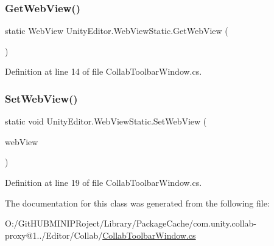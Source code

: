 \subsubsection{\texorpdfstring{GetWebView()}{GetWebView()}}
{\footnotesize\ttfamily static Web\+View Unity\+Editor.\+Web\+View\+Static.\+Get\+Web\+View (\begin{DoxyParamCaption}{ }\end{DoxyParamCaption})\hspace{0.3cm}{\ttfamily [static]}}



Definition at line 14 of file Collab\+Toolbar\+Window.\+cs.

\mbox{\label{class_unity_editor_1_1_web_view_static_aa02b3cff0fabf2f7ebf05c4bd402f977}} 
\subsubsection{\texorpdfstring{SetWebView()}{SetWebView()}}
{\footnotesize\ttfamily static void Unity\+Editor.\+Web\+View\+Static.\+Set\+Web\+View (\begin{DoxyParamCaption}\item[{Web\+View}]{web\+View }\end{DoxyParamCaption})\hspace{0.3cm}{\ttfamily [static]}}



Definition at line 19 of file Collab\+Toolbar\+Window.\+cs.



The documentation for this class was generated from the following file\+:\begin{DoxyCompactItemize}
\item 
O\+:/\+Git\+H\+U\+B\+M\+I\+N\+I\+P\+Roject/\+Library/\+Package\+Cache/com.\+unity.\+collab-\/proxy@1../\+Editor/\+Collab/\mbox{\hyperlink{_collab_toolbar_window_8cs}{Collab\+Toolbar\+Window.\+cs}}\end{DoxyCompactItemize}
